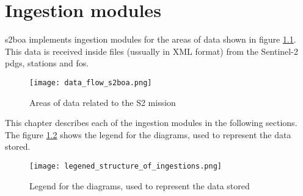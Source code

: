 \chapter{Ingestion modules}

\acrshort{s2}\acrshort{boa} implements ingestion modules for the areas of data shown in figure \ref{fg:data_flow_s2boa}. This data is received inside files (ussually in XML format) from the Sentinel-2 \acrshort{pdgs}, stations and \acrshort{fos}.

\begin{figure}[H]
  \begin{center}
	\centering\texttt{[image: data\_flow\_s2boa.png]}
	\caption{Areas of data related to the S2 mission}
	\label{fg:data_flow_s2boa}
  \end{center}
\end{figure}


This chapter describes each of the ingestion modules in the following sections. The figure \ref{fg:legened_structure_of_ingestions} shows the legend for the diagrams, used to represent the data stored.

\begin{figure}[H]
  \begin{center}
	\centering\texttt{[image: legened\_structure\_of\_ingestions.png]}
	\caption{Legend for the diagrams, used to represent the data stored}
	\label{fg:legened_structure_of_ingestions}
  \end{center}
\end{figure}















% 
